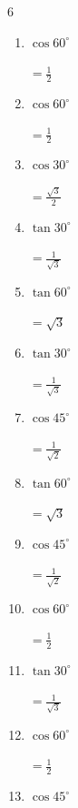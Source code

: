 \begin{multicols}{6}
\begin{enumerate}
        $\displaystyle =\frac{1}{\sqrt{2}}$

  \item $\displaystyle \cos{60^\circ}$

        $\displaystyle =\frac{1}{2}$

  \item $\displaystyle \cos{60^\circ}$

        $\displaystyle =\frac{1}{2}$

  \item $\displaystyle \cos{30^\circ}$

        $\displaystyle =\frac{\sqrt{3}}{2}$

  \item $\displaystyle \tan{30^\circ}$

        $\displaystyle =\frac{1}{\sqrt{3}}$

  \item $\displaystyle \tan{60^\circ}$

        $\displaystyle =\sqrt{3}$

  \item $\displaystyle \tan{30^\circ}$

        $\displaystyle =\frac{1}{\sqrt{3}}$

  \item $\displaystyle \cos{45^\circ}$

        $\displaystyle =\frac{1}{\sqrt{2}}$

  \item $\displaystyle \tan{60^\circ}$

        $\displaystyle =\sqrt{3}$

  \item $\displaystyle \cos{45^\circ}$

        $\displaystyle =\frac{1}{\sqrt{2}}$

  \item $\displaystyle \cos{60^\circ}$

        $\displaystyle =\frac{1}{2}$

  \item $\displaystyle \tan{30^\circ}$

        $\displaystyle =\frac{1}{\sqrt{3}}$

  \item $\displaystyle \cos{60^\circ}$

        $\displaystyle =\frac{1}{2}$

  \item $\displaystyle \cos{45^\circ}$


\end{enumerate}
\end{multicols}
